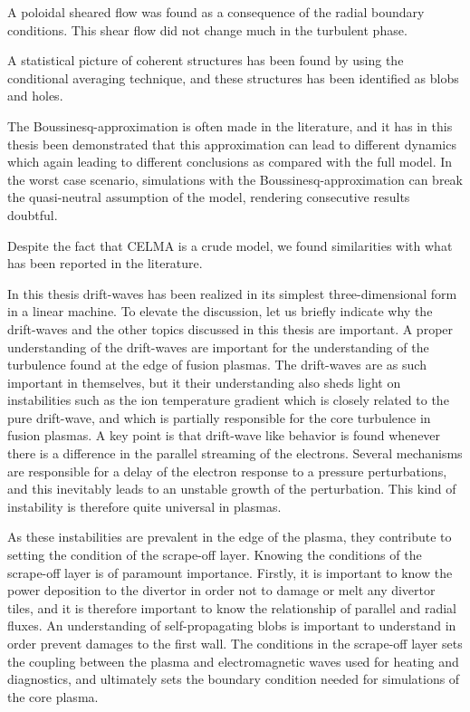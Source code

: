 A poloidal sheared flow was found as a consequence of the radial boundary conditions.
This shear flow did not change much in the turbulent phase.

A statistical picture of coherent structures has been found by using the conditional averaging technique, and these structures has been identified as blobs and holes.

The Boussinesq-approximation is often made in the literature, and it has in this thesis been demonstrated that this approximation can lead to different dynamics which again leading to different conclusions as compared with the full model.
In the worst case scenario, simulations with the Boussinesq-approximation can break the quasi-neutral assumption of the model, rendering consecutive results doubtful.

Despite the fact that CELMA is a crude model, we found similarities with what has been reported in the literature.

In this thesis drift-waves has been realized in its simplest three-dimensional form in a linear machine.
To elevate the discussion, let us briefly indicate why the drift-waves and the other topics discussed in this thesis are important.
A proper understanding of the drift-waves are important for the understanding of the turbulence found at the edge of fusion plasmas.
The drift-waves are as such important in themselves, but it their understanding also sheds light on instabilities such as the ion temperature gradient which is closely related to the pure drift-wave, and which is partially responsible for the core turbulence in fusion plasmas.
A key point is that drift-wave like behavior is found whenever there is a difference in the parallel streaming of the electrons.
Several mechanisms are responsible for a delay of the electron response to a pressure perturbations, and this inevitably leads to an unstable growth of the perturbation.
This kind of instability is therefore quite universal in plasmas.

As these instabilities are prevalent in the edge of the plasma, they contribute to setting the condition of the scrape-off layer.
Knowing the conditions of the scrape-off layer is of paramount importance.
Firstly, it is important to know the power deposition to the divertor in order not to damage or melt any divertor tiles, and it is therefore important to know the relationship of parallel and radial fluxes.
An understanding of self-propagating blobs is important to understand in order prevent damages to the first wall.
The conditions in the scrape-off layer sets the coupling between the plasma and electromagnetic waves used for heating and diagnostics, and ultimately sets the boundary condition needed for simulations of the core plasma.

